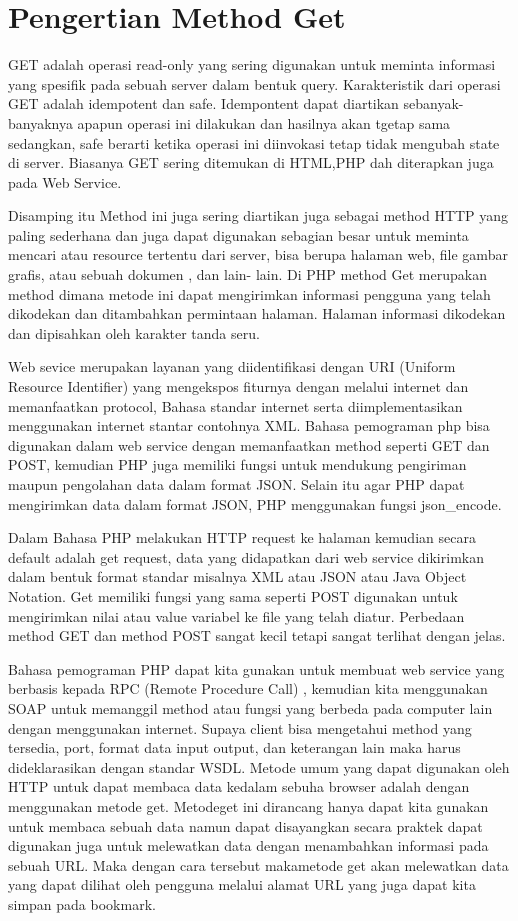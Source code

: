 \section{Pengertian Method Get}
GET adalah operasi read-only yang sering digunakan untuk meminta informasi yang spesifik pada sebuah server dalam bentuk query. 
Karakteristik dari operasi GET adalah idempotent dan safe. Idempontent dapat diartikan sebanyak-banyaknya apapun operasi ini dilakukan 
dan hasilnya akan tgetap sama sedangkan, safe berarti ketika operasi ini diinvokasi tetap tidak mengubah state di server.
Biasanya GET sering ditemukan di HTML,PHP dah diterapkan juga pada Web Service.

Disamping itu Method ini juga sering diartikan juga sebagai method HTTP yang paling sederhana dan juga dapat digunakan sebagian besar 
untuk meminta mencari atau resource tertentu dari server, bisa berupa halaman web, file gambar grafis, atau sebuah dokumen , dan lain-
lain.  Di PHP method Get merupakan method dimana metode ini dapat mengirimkan informasi pengguna yang telah dikodekan dan ditambahkan 
permintaan halaman. Halaman informasi dikodekan dan dipisahkan oleh karakter tanda seru.

Web sevice merupakan layanan yang diidentifikasi dengan URI (Uniform Resource Identifier) yang mengekspos fiturnya dengan melalui 
internet dan memanfaatkan protocol, Bahasa standar internet  serta diimplementasikan menggunakan internet stantar contohnya XML. Bahasa 
pemograman php bisa digunakan dalam web service dengan memanfaatkan method seperti GET dan POST, kemudian PHP juga memiliki fungsi 
untuk mendukung pengiriman maupun pengolahan data dalam format JSON. Selain itu  agar PHP dapat mengirimkan data dalam format JSON, PHP 
menggunakan fungsi json_encode.  

Dalam Bahasa PHP melakukan HTTP request ke halaman kemudian secara default adalah get request, data yang didapatkan dari web service 
dikirimkan dalam bentuk format standar misalnya XML atau JSON atau Java Object Notation. Get memiliki fungsi yang sama seperti POST 
digunakan untuk mengirimkan nilai atau value variabel ke file yang telah diatur. Perbedaan method GET dan method POST sangat kecil 
tetapi sangat terlihat dengan jelas.

Bahasa pemograman PHP dapat kita gunakan untuk membuat web service yang  berbasis kepada RPC (Remote Procedure Call) , kemudian kita 
menggunakan SOAP untuk memanggil method atau fungsi yang berbeda pada computer lain dengan menggunakan internet. Supaya client bisa 
mengetahui method yang tersedia, port, format data input output, dan keterangan lain maka harus  dideklarasikan dengan standar WSDL.    
Metode umum yang dapat digunakan oleh HTTP untuk dapat membaca data kedalam sebuha browser adalah dengan menggunakan metode get. 
Metodeget ini dirancang hanya dapat kita gunakan untuk membaca sebuah data namun dapat disayangkan secara praktek dapat digunakan juga untuk melewatkan data dengan menambahkan informasi pada sebuah URL. Maka dengan cara tersebut makametode get akan melewatkan data yang dapat dilihat oleh pengguna melalui alamat URL yang juga dapat kita simpan pada bookmark.

